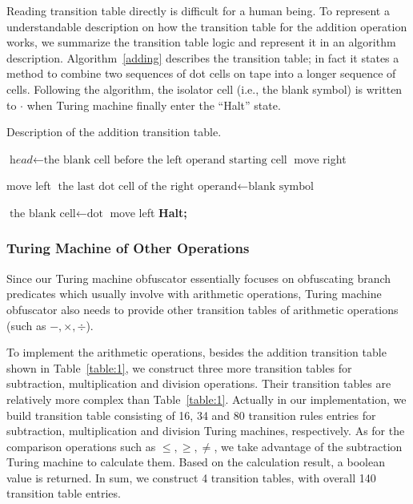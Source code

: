 \documentclass[lnicst]{svmultln}
\begin{document}
Reading transition table directly is difficult for a human being. To represent a
understandable description on how the transition table for the addition
operation works, we summarize the transition table logic and represent it in an
algorithm description. Algorithm~\ref{adding} describes the transition table; in
fact it states a method to combine two sequences of dot cells on tape into a
longer sequence of cells. Following the algorithm, the isolator cell (i.e., the
blank symbol) is written to $\cdot$ when Turing machine finally enter the ``Halt'' state.

\begin{algorithm}
\caption{Description of the addition transition table.}
\label{adding}
\begin{algorithmic}[1]
\Procedure{}{}
\State $\textit{head} \gets \text{the blank cell before the left operand starting cell}$
 move right\;
\EndWhile

\State move left
\State $\text{the last dot cell of the right operand} \gets \text{blank symbol}$

\EndWhile
\State $\text{the blank cell} \gets \text{dot}$
  move left\;
\EndWhile
\State \textbf{Halt;}
\EndProcedure
\end{algorithmic}
\end{algorithm}

\subsubsection{Turing Machine of Other Operations}
Since our Turing machine obfuscator essentially
focuses on obfuscating branch predicates which usually involve with arithmetic operations, Turing machine obfuscator also needs to
provide other transition tables of arithmetic operations (such as $ -, \times,
\div$).

To implement the arithmetic operations, besides the addition transition table
shown in Table~\ref{table:1}, we construct three more transition tables for subtraction,
multiplication and division operations. Their transition tables are relatively
more complex than Table~\ref{table:1}. Actually in our implementation, we build
transition table consisting of 16, 34 and 80 transition rules entries for
subtraction, multiplication and division Turing machines, respectively. As for
the comparison operations such as \(\leq, \geq, \neq\), we take advantage of the
subtraction Turing machine to calculate them. Based on the calculation result, a
boolean value is returned. In sum, we construct 4 transition tables, with
overall 140 transition table entries.
\end{document}
